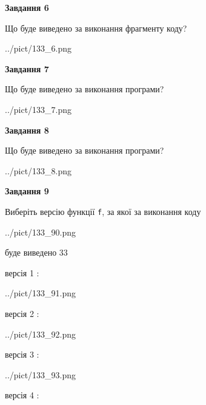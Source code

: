 \documentclass[12pt, ukrainian]{article}
\def\code#1{\Verb!#1!}
\begin{document}
{\begin {large}
{\begin {center}\textbf{Завдання 6}\end {center}}

Що буде виведено за виконання фрагменту коду?\par
\begin{center}
	{../pict/133_6.png}
\end{center}
\newpage

{\begin {center}\textbf{Завдання 7}\end {center}}

Що буде виведено за виконання програми?\par
\begin{center}
	{../pict/133_7.png}
\end{center}
\newpage

{\begin {center}\textbf{Завдання 8}\end {center}}

Що буде виведено за виконання програми?\par
\begin{center}
	{../pict/133_8.png}
\end{center}
\newpage

{\begin {center}\textbf{Завдання 9}\end {center}}

Виберіть версію функції \code{f}, за якої за виконання коду
\begin{center}
	{../pict/133_90.png}
\end{center}
буде виведено 33

\vspace{5mm}
версія 1 :

\begin{center}
	{../pict/133_91.png}
\end{center}
версія 2 :

\begin{center}
	{../pict/133_92.png}
\end{center}
версія 3 :

\begin{center}
	{../pict/133_93.png}
\end{center}
версія 4 :


\end{large}}
\end{document}
